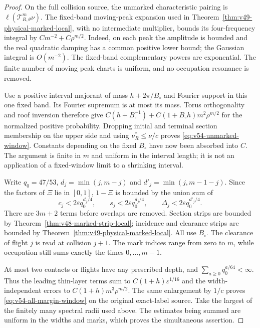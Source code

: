 \begin{proof}
On the full collision source, the unmarked characteristic pairing is
$\ell(\mathscr T_{R,\theta}^m\nu)$. The fixed-band moving-peak
expansion used in Theorem~\ref{thm:v49-physical-marked-local}, with
no intermediate multiplier, bounds its four-frequency integral by
$C m^{-2}+C\rho^{m/2}$. Indeed, on each peak the amplitude is bounded
and the real quadratic damping has a common positive lower bound;
the Gaussian integral is $O(m^{-2})$. The fixed-band complementary
powers are exponential. The finite number of moving peak charts is
uniform, and no occupation resonance is removed.

Use a positive interval majorant of mass $h+2\pi/B_\circ$ and
Fourier support in this one fixed band. Its Fourier supremum is at
most its mass. Torus orthogonality and roof inversion therefore give
$C(h+B_\circ^{-1})+C(1+B_\circ h)m^2\rho^{m/2}$ for the
normalized positive probability. Dropping initial and terminal section
membership on the upper side and using $\nu_R^*\le\nu/c$ proves
\eqref{eq:v54-unmarked-window}. Constants depending on the fixed
$B_\circ$ have now been absorbed into $C$. The argument is finite
in $m$ and uniform in the interval length; it is not an application
of a fixed-window limit to a shrinking interval.

Write $q_0=47/53$, $d_j=\min(j,m-j)$ and
$d'_j=\min(j,m-1-j)$. Since the factors of $\Xi$ lie in $[0,1]$,
$1-\Xi$ is bounded by the union sum of
\[
 c_j<2\varepsilon q_0^{d_j/4},\qquad
 s_j<2\varepsilon q_0^{d_j/4},\qquad
 \Delta_j<2\varepsilon q_0^{d'_j/4}.
\]
There are $3m+2$ terms before overlaps are removed. Section strips
are bounded by Theorem~\ref{thm:v48-marked-strip-local}; incidence
and clearance strips are bounded by
Theorem~\ref{thm:v49-physical-marked-local}. All use $B_\circ$.
The clearance of flight $j$ is read at collision $j+1$. The mark
indices range from zero to $m$, while occupation still sums exactly
the times $0,\ldots,m-1$.

At most two contacts or flights have any prescribed depth, and
$\sum_{a\ge0}q_0^{a/64}<\infty$. Thus the leading thin-layer terms
sum to $C(1+h)\varepsilon^{1/16}$ and the width-independent errors
to $C(1+h)m^3\rho^{m/2}$. The same enlargement by $1/c$ proves
\eqref{eq:v54-all-margin-window} on the original exact-label source.
Take the largest of the finitely many spectral radii used above.
The estimates being summed are uniform in the widths and marks,
which proves the simultaneous assertion.
\end{proof}

